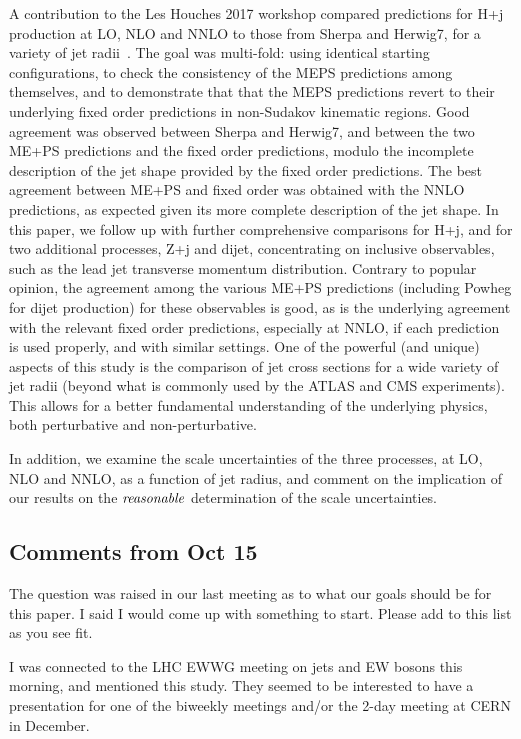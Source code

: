 \documentclass[aps,prd,onecolumn,fleqn,superscriptaddress,groupedaddress,nofootinbib,preprintnumbers,nobalancelastpage]{revtex4}
\begin{document}
A contribution to the Les Houches 2017 workshop compared predictions for H+j production at LO, NLO and NNLO to those from Sherpa and Herwig7, for a variety of jet radii~\cite{LH17}. The goal was multi-fold: using identical
starting configurations, to check the consistency of the MEPS
predictions among themselves, and to demonstrate that that the MEPS
predictions revert to their underlying fixed order predictions in
non-Sudakov kinematic regions. Good agreement was observed between Sherpa and Herwig7, and between the two ME+PS predictions and the fixed order predictions, modulo the incomplete description of the jet shape provided by the fixed order predictions. The best agreement between ME+PS and fixed order was obtained with the NNLO predictions, as expected given its more complete description of the jet shape. In this paper, we follow up with further comprehensive comparisons for H+j, and for two additional processes, Z+j and dijet, concentrating on inclusive observables, such as the lead jet transverse momentum distribution. Contrary to popular opinion, the agreement among the various ME+PS predictions (including Powheg for dijet production) for these observables is good, as is the underlying agreement with the relevant fixed order predictions, especially at NNLO, if each prediction is used properly, and with similar settings. One of the powerful (and unique) aspects of this study is the comparison of jet cross sections for a wide variety of jet radii (beyond what is commonly used by the ATLAS and CMS experiments). This allows for a better fundamental understanding of the underlying physics, both perturbative and non-perturbative. 

In addition, we examine the scale uncertainties of the three processes, at LO, NLO and NNLO, as a function of jet radius, and comment on the implication of our results on the $\it reasonable$ determination of the scale uncertainties. 

\subsection{Comments from Oct 15}

The question was raised in our last meeting as to what our goals should be for this paper. I said I would come up with something to start. Please add to this list as you see fit. 

I was connected to the LHC EWWG meeting on jets and EW bosons this morning, and mentioned this study. They seemed to be interested to have a presentation for one of the biweekly meetings and/or the 2-day meeting at CERN in December. 
\end{document}
